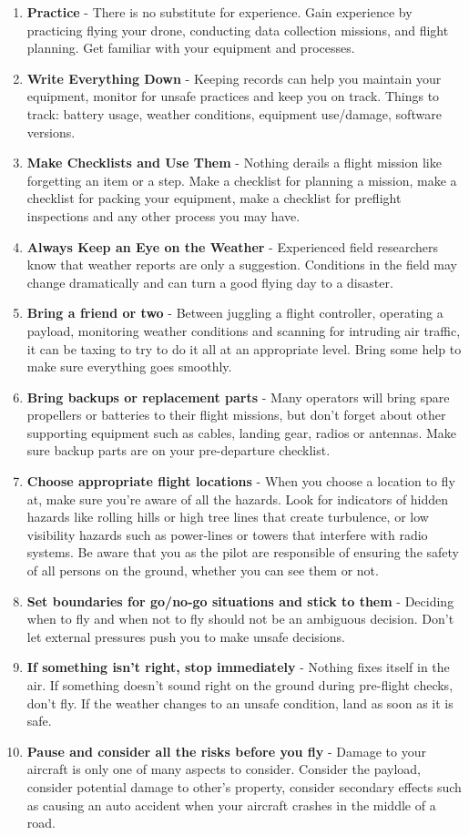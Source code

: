 \documentclass[
  12pt,
]{book}
\providecommand{\tightlist}{%
  \setlength{\itemsep}{0pt}\setlength{\parskip}{0pt}}
\begin{document}
\begin{enumerate}
\def\labelenumi{\arabic{enumi}.}
\tightlist
\item
  \textbf{Practice} - There is no substitute for experience. Gain experience by practicing flying your drone, conducting data collection missions, and flight planning. Get familiar with your equipment and processes.
\item
  \textbf{Write Everything Down} - Keeping records can help you maintain your equipment, monitor for unsafe practices and keep you on track. Things to track: battery usage, weather conditions, equipment use/damage, software versions.
\item
  \textbf{Make Checklists and Use Them} - Nothing derails a flight mission like forgetting an item or a step. Make a checklist for planning a mission, make a checklist for packing your equipment, make a checklist for preflight inspections and any other process you may have.
\item
  \textbf{Always Keep an Eye on the Weather} - Experienced field researchers know that weather reports are only a suggestion. Conditions in the field may change dramatically and can turn a good flying day to a disaster.
\item
  \textbf{Bring a friend or two} - Between juggling a flight controller, operating a payload, monitoring weather conditions and scanning for intruding air traffic, it can be taxing to try to do it all at an appropriate level. Bring some help to make sure everything goes smoothly.
\item
  \textbf{Bring backups or replacement parts} - Many operators will bring spare propellers or batteries to their flight missions, but don't forget about other supporting equipment such as cables, landing gear, radios or antennas. Make sure backup parts are on your pre-departure checklist.
\item
  \textbf{Choose appropriate flight locations} - When you choose a location to fly at, make sure you're aware of all the hazards. Look for indicators of hidden hazards like rolling hills or high tree lines that create turbulence, or low visibility hazards such as power-lines or towers that interfere with radio systems. Be aware that you as the pilot are responsible of ensuring the safety of all persons on the ground, whether you can see them or not.
\item
  \textbf{Set boundaries for go/no-go situations and stick to them} - Deciding when to fly and when not to fly should not be an ambiguous decision. Don't let external pressures push you to make unsafe decisions.
\item
  \textbf{If something isn't right, stop immediately} - Nothing fixes itself in the air. If something doesn't sound right on the ground during pre-flight checks, don't fly. If the weather changes to an unsafe condition, land as soon as it is safe.
\item
  \textbf{Pause and consider all the risks before you fly} - Damage to your aircraft is only one of many aspects to consider. Consider the payload, consider potential damage to other's property, consider secondary effects such as causing an auto accident when your aircraft crashes in the middle of a road.
\end{enumerate}
\end{document}
